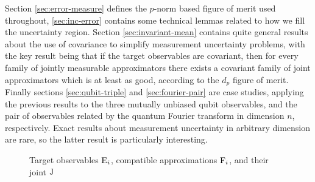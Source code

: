 Section \ref{sec:error-measure} defines the $p$-norm based figure of merit used throughout, \ref{sec:inc-error} contains some technical lemmas related to how we fill the uncertainty region. Section \ref{sec:invariant-mean} contains quite general results about the use of covariance to simplify measurement uncertainty problems, with the key result being that if the target observables are covariant, then for every family of jointly measurable approximators there exists a covariant family of joint approximators which is at least as good, according to the $d_p$ figure of merit. Finally sections \ref{sec:qubit-triple} and \ref{sec:fourier-pair} are case studies, applying the previous results to the three mutually unbiased qubit observables, and the pair of observables related by the quantum Fourier transform in dimension $n$, respectively. Exact results about measurement uncertainty in arbitrary dimension are rare, so the latter result is particularly interesting.

\begin{figure}[ht]
  \centering
  \caption{Target observables $\operatorname{E}_i$,  compatible approximations $\operatorname{F}_i$, and their joint $\operatorname{J}$}
  \label{fig:depict-meas-uncertainty}
\end{figure}

